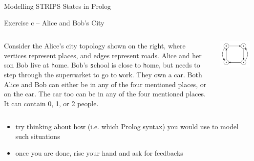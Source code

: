 \documentclass[presentation]{beamer}\mode<presentation>{\usetheme{AMSBolognaFC}}
\begin{document}
\begin{frame}[allowframebreaks]{Modelling STRIPS States in Prolog}
\begin{block}{Exercise \currentExercise{}c -- Alice and Bob's City}
	\begin{columns}
		\begin{column}{.7\linewidth}
			Consider the Alice's city topology shown on the right, where vertices represent places, and edges represent roads.
			Alice and her son Bob live at \alert{\texttt{h}}ome.
			Bob's \alert{\texttt{s}}chool is close to \alert{\texttt{h}}ome, but needs to step through the super\alert{\texttt{m}}arket to go to \alert{\texttt{w}}ork.
			They own a car.
			Both Alice and Bob can either be in any of the four mentioned places, or on the car.
			The car too can be in any of the four mentioned places.
			It can contain 0, 1, or 2 people.
		\end{column}
		\begin{column}{.3\linewidth}
			\includegraphics[width=\linewidth]{./figures/city.pdf}
		\end{column}
	\end{columns}
\end{block}

\begin{itemize}
	\item try thinking about \alert{how} (i.e. which Prolog syntax) you would use to model such situations

	\item once you are done, rise your hand and ask for feedbacks
\end{itemize}
\end{frame}
\end{document}
